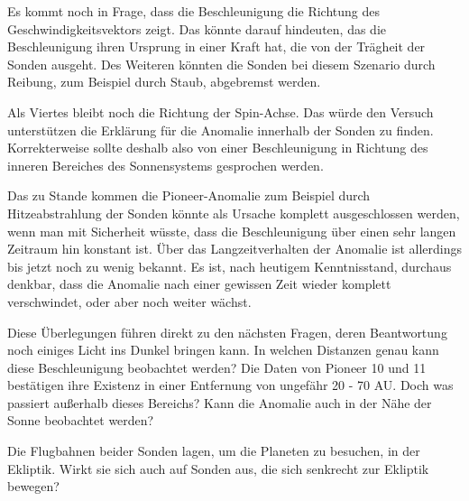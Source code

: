 \bigskip

Es kommt noch in Frage, dass die Beschleunigung die Richtung des
Geschwindigkeitsvektors zeigt. Das k\"onnte darauf hindeuten, das die
Beschleunigung ihren Ursprung in einer Kraft hat, die von der
Tr\"agheit der Sonden ausgeht. Des Weiteren k\"onnten die Sonden bei
diesem Szenario durch Reibung, zum Beispiel durch Staub, abgebremst
werden.


\bigskip

Als Viertes bleibt noch die Richtung der Spin-Achse. Das w\"urde den
Versuch unterst\"utzen die Erkl\"arung f\"ur die Anomalie innerhalb der
Sonden zu finden. Korrekterweise sollte deshalb also von einer
Beschleunigung in Richtung des inneren Bereiches des Sonnensystems
gesprochen werden.


\bigskip

Das zu Stande kommen die Pioneer-Anomalie zum Beispiel durch
Hitzeabstrahlung der Sonden k\"onnte als Ursache komplett
ausgeschlossen werden, wenn man mit Sicherheit w\"usste, dass die
Beschleunigung \"uber einen sehr langen Zeitraum hin konstant ist.
\"Uber das Langzeitverhalten der Anomalie ist allerdings bis jetzt noch
zu wenig bekannt. Es ist, nach heutigem Kenntnisstand, durchaus
denkbar, dass die Anomalie nach einer gewissen Zeit wieder komplett
verschwindet, oder aber noch weiter w\"achst.


\bigskip

Diese \"Uberlegungen f\"uhren direkt zu den n\"achsten Fragen, deren
Beantwortung noch einiges Licht ins Dunkel bringen kann. In welchen
Distanzen genau kann diese Beschleunigung beobachtet werden? Die Daten
von Pioneer 10 und 11 best\"atigen ihre Existenz in einer Entfernung
von ungef\"ahr 20 - 70 AU. Doch was passiert au{\ss}erhalb dieses
Bereichs? Kann die Anomalie auch in der N\"ahe der Sonne beobachtet
werden? 

Die Flugbahnen beider Sonden lagen, um die Planeten zu besuchen, in der
Ekliptik. Wirkt sie sich auch auf Sonden aus, die sich senkrecht zur
Ekliptik bewegen?

